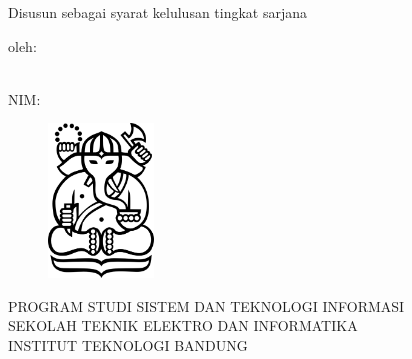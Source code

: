 \clearpage
\pagestyle{empty}

\begin{center}
    \smallskip

    \Large \MakeUppercase{\bfseries \thetitle}
    \vfill

    \normalsize \MakeUppercase{\jenislaporan}
    \vfill

    \normalsize Disusun sebagai syarat kelulusan tingkat sarjana
    \vfill

    \normalsize oleh:

    \normalsize \theauthor \\
    \normalsize NIM: \nim

    \vfill
    \begin{figure}[h]
        \centering
        \includegraphics[width=0.25\textwidth]{resources/cover-ganesha.jpg}
    \end{figure}
    \vfill

    \large
    \uppercase{
        Program Studi Sistem dan Teknologi Informasi \\
        Sekolah Teknik Elektro dan Informatika \\
        Institut Teknologi Bandung
    }

    \yearsidang

\end{center}

\clearpage
